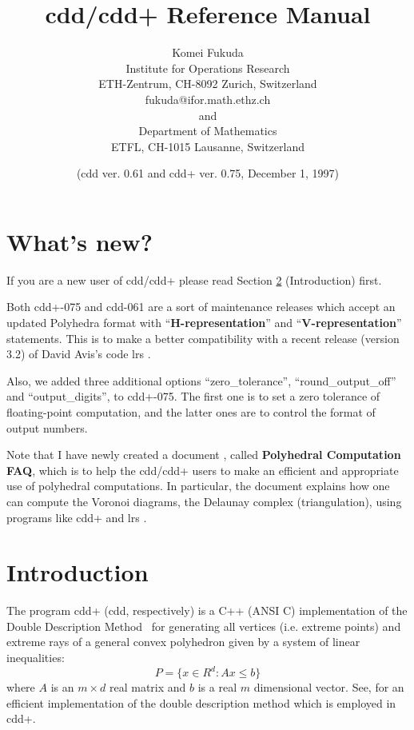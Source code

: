 \documentclass[11pt]{article}
\begin{document}
\title{cdd/cdd+ Reference Manual}
\author{
Komei Fukuda \\
Institute for Operations Research\\
ETH-Zentrum, CH-8092 Zurich, Switzerland\\
fukuda@ifor.math.ethz.ch \\and\\
Department of Mathematics\\
ETFL, CH-1015 Lausanne, Switzerland}
\date{ (cdd ver. 0.61 and cdd+ ver. 0.75,  December 1, 1997)}

\maketitle

\section{What's new?}
If you are a new user of cdd/cdd+ please read Section \ref{INTRODUCTION} (Introduction) first.

Both cdd+-075 and cdd-061 are a sort of maintenance releases which accept
an updated Polyhedra format with  ``{\bf H-representation}'' and 
``{\bf V-representation}'' statements.   This is to make a better
compatibility with a recent release (version 3.2) of David Avis's code lrs \cite{a-uglrs-97}.

Also, we added three additional options ``zero\_tolerance'',
``round\_output\_off'' and ``output\_digits'', to cdd+-075.  
The first one is to set a zero tolerance of floating-point computation,
and the latter ones are to control the format of
output numbers.

Note that I have newly created a document \cite{f-pcfaq-97}, 
called {\bf Polyhedral Computation FAQ},  which is to help the cdd/cdd+ users
to make an efficient and appropriate use 
of polyhedral computations.
In particular, the document explains how one
can compute the Voronoi diagrams, the Delaunay
complex (triangulation), using programs like cdd+
and lrs \cite{a-uglrs-97}.

\section{Introduction} \label{INTRODUCTION}

The program  cdd+  (cdd, respectively)   is 
a C++  (ANSI C) implementation of 
the Double Description Method~\cite{mrtt-ddm-53}
for generating all vertices (i.e. extreme points)
and extreme rays of a general 
convex polyhedron given by a system of linear inequalities:
\[
   P = \{ x  \in R^d:  A  x  \le  b \}
\]
where $A$ is an $m \times d$ real matrix and $b$ is a real
$m$ dimensional vector.   See, \cite{fp-ddmr-96} for
an efficient implementation of the double description
method which is employed in cdd+.
\end{document}
